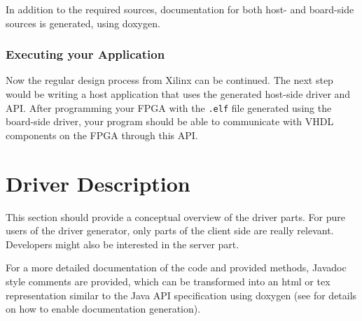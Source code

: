 \documentclass{report}
\begin{document}
In addition to the required sources, documentation for both host- and board-side sources is generated, using doxygen.

\subsection{Executing your Application}
Now the regular design process from Xilinx can be continued. The next step would be writing a host application that uses the generated host-side driver and API. After programming your FPGA with the \texttt{.elf} file generated using the board-side driver, your program should be able to communicate with VHDL components on the FPGA through this API.



\chapter{Driver Description}
This section should provide a conceptual overview of the driver parts. For pure users of the driver generator, only parts of the client side are really relevant. Developers might also be interested in the server part.

For a more detailed documentation of the code and provided methods, Javadoc style comments are provided, which can be transformed into an html or tex representation similar to the Java API specification using doxygen (see  for details on how to enable documentation generation).
\end{document}
